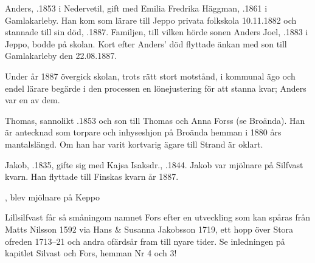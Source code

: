 Anders, .1853 i Nedervetil, gift med Emilia Fredrika Häggman, .1861 i Gamlakarleby. Han kom som lärare till Jeppo privata folkskola 10.11.1882 och stannade till sin död, .1887. Familjen, till vilken hörde sonen Anders Joel, .1883 i Jeppo, bodde på skolan. Kort efter Anders' död flyttade änkan med son till Gamlakarleby den 22.08.1887.

Under år 1887 övergick skolan, trots rätt stort motstånd, i kommunal ägo och endel lärare begärde i den processen en lönejustering för att stanna kvar; Anders var en av dem.


Thomas, sannolikt .1853 och son till Thomas och Anna Forss (se Broända). Han är antecknad som torpare och inhyseshjon på Broända hemman i 1880 års mantalslängd. Om han har varit kortvarig ägare till Strand är oklart.\jhvspace{}


Jakob, .1835, gifte sig med Kajsa Isaksdr., .1844. Jakob var mjölnare på Silfvast kvarn. Han flyttade till Finskas kvarn år 1887.
\begin{jhchildren}
  \item {}, blev mjölnare på Keppo
  \item {}
  \item {}
  \item {}
  \item {}
  \item {}
\end{jhchildren}



Lillsilfvast får så småningom namnet Fors efter en utveckling som kan spåras från Matts Nilsson 1592 via Hans \& Susanna Jakobsson 1719, ett hopp över Stora ofreden 1713--21 och andra ofärdsår fram till nyare tider. Se inledningen på kapitlet Silvast och Fors, hemman Nr 4 och 3!




